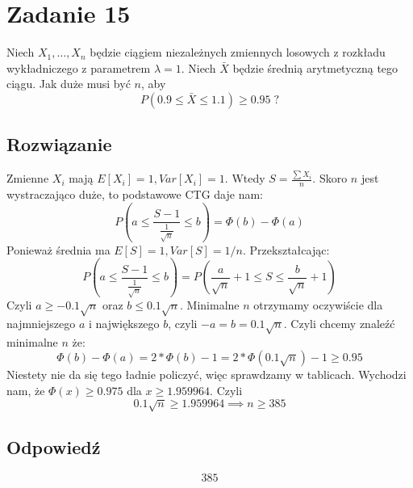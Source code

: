 \section{Zadanie 15}
Niech \(X_1,\dots,X_n\) będzie ciągiem niezależnych zmiennych losowych
z rozkładu wykładniczego z parametrem \(\lambda=1\).
Niech \(\bar X\) będzie średnią arytmetyczną tego ciągu.
Jak duże musi być \(n\), aby
\[
	P(0.9 \le \bar X \le 1.1) \ge 0.95 \; ?
\]

\subsection*{Rozwiązanie}
Zmienne \(X_i\) mają \(E[X_i] = 1, Var[X_i] =1\). Wtedy \(S = \frac{\sum X_i}{n}\). Skoro \(n\) jest wystraczająco duże, to podstawowe CTG daje nam:
\[
	P \left( a \leq \frac{S-1}{\frac{1}{\sqrt{n}}} \leq b \right) = \Phi(b)-\Phi(a)
\]
Ponieważ średnia ma \(E[S] = 1, Var[S] = 1/n\).
Przekształcając:
\[
	P \left( a \leq \frac{S-1}{\frac{1}{\sqrt{n}}} \leq b \right) = P \left( \frac{a}{\sqrt{n}} +1 \leq S \leq \frac{b}{\sqrt{n}}+1 \right)
\]
Czyli \(a \geq -0.1 \sqrt{n}\) oraz \(b \leq 0.1 \sqrt{n}\). Minimalne \(n\) otrzymamy oczywiście dla najmniejszego \(a\) i największego \(b\), czyli \( - a = b = 0.1 \sqrt{n} \). Czyli chcemy znaleźć minimalne \(n\) że:
\[
	\Phi(b) - \Phi(a) = 2*\Phi(b)-1 = 2 * \Phi(0.1 \sqrt{n}) -1 \geq 0.95
\]
Niestety nie da się tego ładnie policzyć, więc sprawdzamy w tablicach. Wychodzi nam, że \(\Phi(x) \geq 0.975\) dla \(x \geq 1.959964\). Czyli
\[
	0.1 \sqrt{n} \geq 1.959964 \implies n \geq 385
\]

\subsection*{Odpowiedź}
\[
	\boxed{\text{385}}
\]
